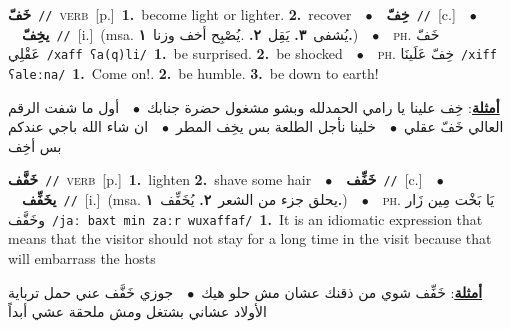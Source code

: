 \documentclass[10pt,a4paper,twoside]{article} %
\begin{document}
\begin{multicols}{2}
{\setlength\topsep{0pt}\textbf{\foreignlanguage{arabic}{خَفّ}}\ {\color{gray}\texttt{//}\color{black}}\ \textsc{verb}\ [p.]\ \textbf{1.}~become light or lighter.  \textbf{2.}~recover\ \ $\bullet$\ \ \setlength\topsep{0pt}\textbf{\foreignlanguage{arabic}{خِفّ}}\ {\color{gray}\texttt{//}\color{black}}\ [c.]\ \ $\bullet$\ \ \setlength\topsep{0pt}\textbf{\foreignlanguage{arabic}{يخِفّ}}\ {\color{gray}\texttt{//}\color{black}}\ [i.]\ \color{gray}(msa. \foreignlanguage{arabic}{يُشفى}~\foreignlanguage{arabic}{\textbf{٣.}}  \foreignlanguage{arabic}{يَقِل}~\foreignlanguage{arabic}{\textbf{٢.}}  .\foreignlanguage{arabic}{يُصْبِح أخف وزنا}~\foreignlanguage{arabic}{\textbf{١.}})\color{black}\ \ $\bullet$\ \ \textsc{ph.} \color{gray} \foreignlanguage{arabic}{خَفّ عَقْلِي}\color{black}\ {\color{gray}\texttt{/{\sffamily xaff ʕa(q)li}/}\color{black}}\ \textbf{1.}~be surprised.  \textbf{2.}~be shocked\ \ $\bullet$\ \ \textsc{ph.} \color{gray} \foreignlanguage{arabic}{خِفّ عَلَينَا}\color{black}\ {\color{gray}\texttt{/{\sffamily xiff ʕaleːna}/}\color{black}}\ \textbf{1.}~Come on!.  \textbf{2.}~be humble.  \textbf{3.}~be down to earth!\  \begin{flushright}\color{gray}\foreignlanguage{arabic}{\textbf{\underline{\foreignlanguage{arabic}{أمثلة}}}: خِف علينا يا رامي الحمدلله وبشو مشغول حضرة جنابك\ $\bullet$\ \  أول ما شفت الرقم العالي خَفّ عقلي\ $\bullet$\ \  خلينا نأجل الطلعة بس يخِف المطر\ $\bullet$\ \  ان شاء الله باجي عندكم بس أخِف}\end{flushright}\color{black}} \vspace{2mm}

{\setlength\topsep{0pt}\textbf{\foreignlanguage{arabic}{خَفَّف}}\ {\color{gray}\texttt{//}\color{black}}\ \textsc{verb}\ [p.]\ \textbf{1.}~lighten  \textbf{2.}~shave some hair\ \ $\bullet$\ \ \setlength\topsep{0pt}\textbf{\foreignlanguage{arabic}{خَفِّف}}\ {\color{gray}\texttt{//}\color{black}}\ [c.]\ \ $\bullet$\ \ \setlength\topsep{0pt}\textbf{\foreignlanguage{arabic}{يخَفِّف}}\ {\color{gray}\texttt{//}\color{black}}\ [i.]\ \color{gray}(msa. \foreignlanguage{arabic}{يحلق جزء من الشعر}~\foreignlanguage{arabic}{\textbf{٢.}}  \foreignlanguage{arabic}{يُخَفِّف}~\foreignlanguage{arabic}{\textbf{١.}})\color{black}\ \ $\bullet$\ \ \textsc{ph.} \color{gray} \foreignlanguage{arabic}{يَا بَخْت مِين زَار وخَفَّف}\color{black}\ {\color{gray}\texttt{/{\sffamily jaː baxt min zaːr wuxaffaf}/}\color{black}}\ \textbf{1.}~It is an idiomatic expression that means that the visitor should not stay for a long time in the visit because that will embarrass the hosts\  \begin{flushright}\color{gray}\foreignlanguage{arabic}{\textbf{\underline{\foreignlanguage{arabic}{أمثلة}}}: خَفِّف شوي من ذقنك عشان مش حلو هيك\ $\bullet$\ \  جوزي خَفَّف عني حمل ترباية الأولاد عشاني بشتغل ومش ملحقة عشي أبداً}\end{flushright}\color{black}} \vspace{2mm}


\end{multicols}
\end{document}
